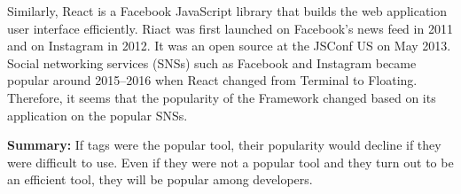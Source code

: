 \documentclass[english,preprint,JIP,technote]{ipsj}
\begin{document}
Similarly, React is a Facebook JavaScript library that builds the web application user interface efficiently. Riact was first launched on Facebook’s news feed in 2011 and on Instagram in 2012. It was an open source at the JSConf US on May 2013. Social networking services (SNSs) such as Facebook and Instagram became popular around 2015–2016 when React changed from Terminal to Floating. Therefore, it seems that the popularity of the Framework changed based on its application on the popular SNSs.


\smallskip\smallskip

\noindent \textbf{Summary:}
If tags were the popular tool, their popularity would decline if they were difficult to use. Even if they were not a popular tool and they turn out to be an efficient tool, they will be popular among developers.

\end{document}
